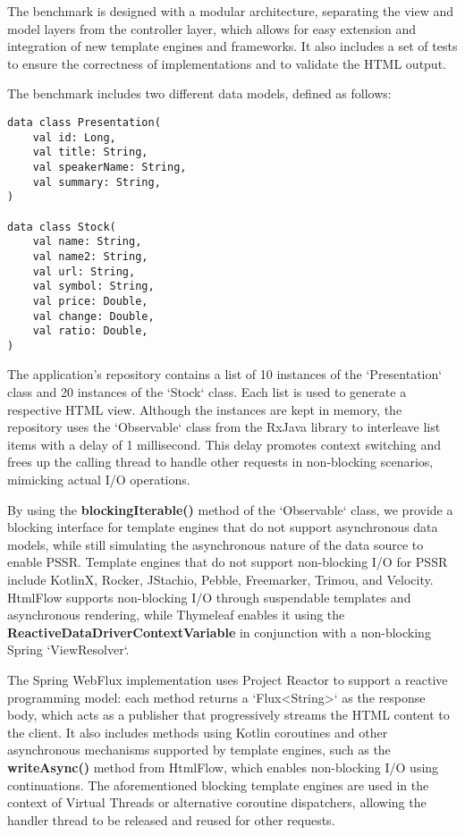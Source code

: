 \documentclass[../ppG48.tex]{subfiles}
\begin{document}
The benchmark is designed with a modular architecture, separating the view and model layers from the controller layer, which allows for easy extension and integration of new template engines and frameworks. It also includes a set of tests to ensure the correctness of implementations and to validate the HTML output.

The benchmark includes two different data models, defined as follows: 
\begin{lstlisting}
data class Presentation(
    val id: Long,
    val title: String,
    val speakerName: String,
    val summary: String,
)

data class Stock(
    val name: String,
    val name2: String,
    val url: String,
    val symbol: String,
    val price: Double,
    val change: Double,
    val ratio: Double,
)
\end{lstlisting}

The application's repository contains a list of 10 instances of the `Presentation` class and 20 instances of the `Stock` class. Each list is used to generate a respective HTML view. Although the instances are kept in memory, the repository uses the `Observable` class from the RxJava library to interleave list items with a delay of 1 millisecond. This delay promotes context switching and frees up the calling thread to handle other requests in non-blocking scenarios, mimicking actual I/O operations.

By using the \textbf{blockingIterable()} method of the `Observable` class, we provide a blocking interface for template engines that do not support asynchronous data models, while still simulating the asynchronous nature of the data source to enable PSSR. Template engines that do not support non-blocking I/O for PSSR include KotlinX, Rocker, JStachio, Pebble, Freemarker, Trimou, and Velocity. HtmlFlow supports non-blocking I/O through suspendable templates and asynchronous rendering, while Thymeleaf enables it using the \textbf{ReactiveDataDriverContextVariable} in conjunction with a non-blocking Spring `ViewResolver`.

The Spring WebFlux implementation uses Project Reactor to support a reactive programming model: each method returns a `Flux<String>` as the response body, which acts as a publisher that progressively streams the HTML content to the client. It also includes methods using Kotlin coroutines and other asynchronous mechanisms supported by template engines, such as the \textbf{writeAsync()} method from HtmlFlow, which enables non-blocking I/O using continuations. The aforementioned blocking template engines are used in the context of Virtual Threads or alternative coroutine dispatchers, allowing the handler thread to be released and reused for other requests.
\end{document}
